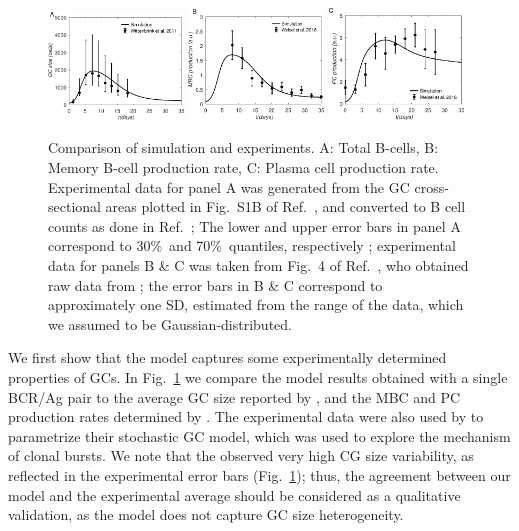 \documentclass[utf8]{frontiersHLTH}%
\newcommand{\vo}[1]{#1} %
\newcommand{\fig}[1]{Fig.~\ref{fig:#1}}
\newcommand{\hfig}[1]{#1} %
\begin{document}
\hfig{
\begin{figure}
\centering
\includegraphics[width=0.32\textwidth]{../fig3/gcsize.eps}
\includegraphics[width=0.32\textwidth]{../fig3/dmbc.eps}
\includegraphics[width=0.32\textwidth]{../fig3/dplc.eps}
\caption{Comparison of simulation and experiments.
A: Total B-cells, B: Memory B-cell production rate, C: Plasma cell
production rate. Experimental data for panel A was generated from the GC
cross-sectional areas plotted in Fig.~S1B of Ref.~\citenum{wittenbrink11}, and converted to B cell counts
as done in Ref.~\citenum{pelissier20}; \vo{The lower and upper error bars in panel A
correspond to 30\%~and 70\%~quantiles, respectively}
; experimental data for panels B \& C was taken from Fig.~4 of Ref.~\citenum{pelissier20}, who
obtained raw data from \citet{weisel16}; the error bars in B \& C correspond to approximately one SD, estimated from the 
range of the data, which we assumed to be Gaussian-distributed.
}
\label{fig:valid}
\end{figure}
}

We first show that the model captures some experimentally determined
properties of GCs. In \fig{valid} we compare the model results obtained
with a single BCR/Ag pair to the average GC size reported by
\citet{wittenbrink11}, and the MBC and PC production rates determined by
\citet{weisel16}. The experimental data were also used by \citet{pelissier20}
to parametrize their stochastic GC model, which was used to explore the
mechanism of clonal bursts.
We note that the
\citet{wittenbrink11} observed very high CG size variability, as
reflected in the experimental error bars (\fig{valid}); thus, the
agreement between our model and the experimental average should be
considered as a qualitative validation, as the model does not capture GC size heterogeneity.
\end{document}
